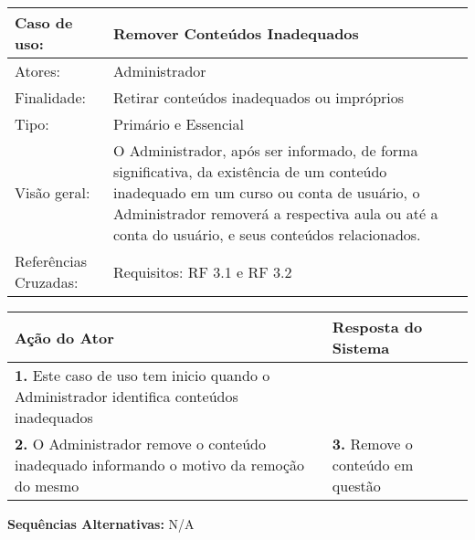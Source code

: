 \documentclass[12pt,a4paper,onecolumn,titlepage]{article}
\begin{document}
\begin{table}[h!]
\begin{center}
\begin{tabular}{p{2.5cm} p{9.5cm}}
Caso de uso: & \textbf{Remover Conteúdos Inadequados} \\ \hline
Atores: & Administrador \\ \hline
Finalidade: & Retirar conteúdos inadequados ou impróprios\\ \hline
Tipo: & Primário e Essencial \\ \hline
Visão geral: & O Administrador, após ser informado, de forma significativa, da existência de um conteúdo inadequado em um curso ou conta de usuário, o Administrador removerá a respectiva aula ou até a conta do usuário, e seus conteúdos relacionados. \\ \hline
Referências Cruzadas: & Requisitos: RF 3.1 e RF 3.2\\ 

\end{tabular}
\end{center}
\end{table}

\begin{center}
\def\arraystretch{1.1}
\begin{tabular}{|p{6cm}|p{6cm}|}

\hline
\textbf{Ação do Ator} & \textbf{Resposta do Sistema} \\ \hline
\textbf{1.} Este caso de uso tem inicio quando o Administrador identifica conteúdos inadequados  & \\ \hline
\textbf{2.} O Administrador remove o conteúdo inadequado informando o motivo da remoção do mesmo  & \textbf{3.} Remove o conteúdo em questão  \\ \hline
\end{tabular}
\end{center}

\textbf{Sequências Alternativas:} N/A

\newpage
\end{document}

